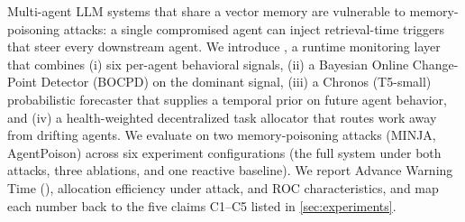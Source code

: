 Multi-agent LLM systems that share a vector memory are vulnerable to
memory-poisoning attacks: a single compromised agent can inject
retrieval-time triggers that steer every downstream agent. We introduce
\sys{}, a runtime monitoring layer that combines (i) six per-agent
behavioral signals, (ii) a Bayesian Online Change-Point Detector (BOCPD)
on the dominant signal, (iii) a Chronos (T5-small) probabilistic forecaster
that supplies a temporal prior on future agent behavior, and (iv) a
health-weighted decentralized task allocator that routes work away from
drifting agents. We evaluate \sys{} on two memory-poisoning attacks
(MINJA, AgentPoison) across six experiment configurations (the
full system under both attacks, three ablations, and one reactive
baseline). We report Advance
Warning Time (\awt{}), allocation efficiency under attack, and ROC
characteristics, and map each number back to the five claims C1--C5
listed in \cref{sec:experiments}.
